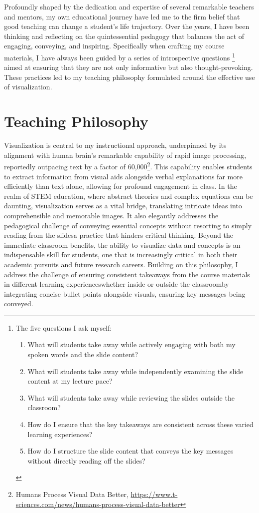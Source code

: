 Profoundly shaped by the dedication and expertise of several remarkable teachers and mentors, my own educational journey have led me to the firm belief that good teaching can change a student's life trajectory. Over the years, I have been thinking and reflecting on the quintessential pedagogy that balances the act of engaging, conveying, and inspiring. Specifically when crafting my course materials, I have always been guided by a series of introspective questions%
\footnote{%
    The five questions I ask myself:
    \begin{enumerate}
        \item What will students take away while actively engaging with both my spoken words and the slide content?
        \item What will students take away while independently examining the slide content at my lecture pace?
        \item What will students take away while reviewing the slides outside the classroom?
        \item How do I ensure that the key takeaways are consistent across these varied learning experiences?
        \item How do I structure the slide content that conveys the key messages without directly reading off the slides?
    \end{enumerate}
}
aimed at ensuring that they are not only informative but also thought-provoking. These practices led to my teaching philosophy formulated around the effective use of visualization.

\section{Teaching Philosophy}
Visualization is central to my instructional approach, underpinned by its alignment with human brain's remarkable capability of rapid image processing, reportedly outpacing text by a factor of 60,000\footnote{Humans Process Visual Data Better, \url{https://www.t-sciences.com/news/humans-process-visual-data-better}}.
This capability enables students to extract information from visual aids alongside verbal explanations far more efficiently than text alone, allowing for profound engagement in class. In the realm of STEM education, where abstract theories and complex equations can be daunting, visualization serves as a vital bridge, translating intricate ideas into comprehensible and memorable images. It also elegantly addresses the pedagogical challenge of conveying essential concepts without resorting to simply reading from the slides\textemdash a practice that hinders critical thinking. Beyond the immediate classroom benefits, the ability to visualize data and concepts is an indispensable skill for students, one that is increasingly critical in both their academic pursuits and future research careers. Building on this philosophy, I address the challenge of ensuring consistent takeaways from the course materials in different learning experiences\textemdash whether inside or outside the classroom\textemdash by integrating concise bullet points alongside visuals, ensuring key messages being conveyed.

